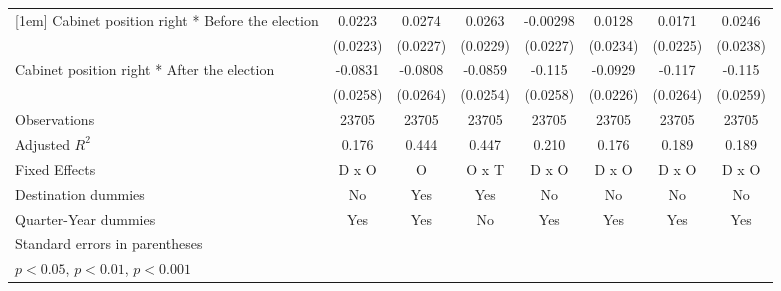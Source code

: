 \begin{table}[htbp]
\begin{tabular}{l*{7}{c}}
[1em]
Cabinet position right * Before the election&      0.0223         &      0.0274         &      0.0263         &    -0.00298         &      0.0128         &      0.0171         &      0.0246         \\
                    &    (0.0223)         &    (0.0227)         &    (0.0229)         &    (0.0227)         &    (0.0234)         &    (0.0225)         &    (0.0238)         \\
[1em]
Cabinet position right * After the election&     -0.0831\sym{**} &     -0.0808\sym{**} &     -0.0859\sym{**} &      -0.115\sym{***}&     -0.0929\sym{***}&      -0.117\sym{***}&      -0.115\sym{***}\\
                    &    (0.0258)         &    (0.0264)         &    (0.0254)         &    (0.0258)         &    (0.0226)         &    (0.0264)         &    (0.0259)         \\
\hline
Observations        &       23705         &       23705         &       23705         &       23705         &       23705         &       23705         &       23705         \\
Adjusted \(R^{2}\)  &       0.176         &       0.444         &       0.447         &       0.210         &       0.176         &       0.189         &       0.189         \\
Fixed Effects       &       D x O         &           O         &       O x T         &       D x O         &       D x O         &       D x O         &       D x O         \\
Destination dummies &          No         &         Yes         &         Yes         &          No         &          No         &          No         &          No         \\
Quarter-Year dummies&         Yes         &         Yes         &          No         &         Yes         &         Yes         &         Yes         &         Yes         \\
\hline\hline
\multicolumn{8}{l}{\footnotesize Standard errors in parentheses}\\
\multicolumn{8}{l}{\footnotesize \sym{*} \(p<0.05\), \sym{**} \(p<0.01\), \sym{***} \(p<0.001\)}\\
\end{tabular}
\end{table}
